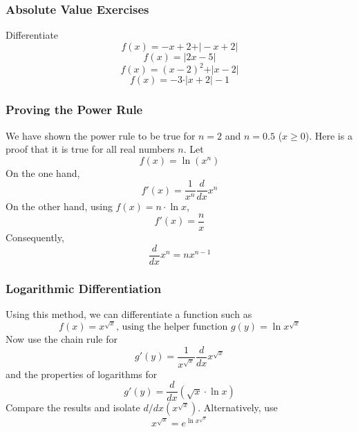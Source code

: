 \documentclass[xcolor=dvipsnames]{beamer}
\begin{document}
\begin{frame}
  \frametitle{Absolute Value Exercises}
Differentiate
\begin{equation}
  \label{eq:ikaishup}
  f(x)=-x+2+\vert{}-x+2\vert
\end{equation}
\begin{equation}
  \label{eq:emaiyito}
  f(x)=\vert{}2x-5\vert
\end{equation}
\begin{equation}
  \label{eq:deiquohr}
  f(x)=(x-2)^{2}+\vert{}x-2\vert
\end{equation}
\begin{equation}
  \label{eq:leihuwee}
  f(x)=-3\cdot\vert{}x+2\vert{}-1
\end{equation}
\end{frame}

\begin{frame}
  \frametitle{Proving the Power Rule}
  We have shown the power rule to be true for $n=2$ and $n=0.5$
  ($x\geq{}0$). Here is a proof that it is true for all real numbers
  $n$. Let
\begin{equation}
  \label{eq:taesaeph}
  f(x)=\ln\left({}x^{n}\right)
\end{equation}
On the one hand,
\begin{equation}
  \label{eq:uzahheir}
  f'(x)=\frac{1}{x^{n}}\frac{d}{dx}x^{n}
\end{equation}
On the other hand, using $f(x)=n\cdot\ln{}x$,
\begin{equation}
  \label{eq:veikoowa}
f'(x)=\frac{n}{x}  
\end{equation}
Consequently,
\begin{equation}
  \label{eq:aebiedah}
  \frac{d}{dx}x^{n}=nx^{n-1}
\end{equation}
\end{frame}

\begin{frame}
  \frametitle{Logarithmic Differentiation}
Using this method, we can differentiate a function such as
\begin{equation}
  \label{eq:ooteiquo}
  f(x)=x^{\sqrt{x}}\mbox{, using the helper function }g(y)=\ln{}x^{\sqrt{x}}
\end{equation}
Now use the chain rule for
\begin{equation}
  \label{eq:quuquish}
  g'(y)=\frac{1}{x^{\sqrt{x}}}\frac{d}{dx}x^{\sqrt{x}}
\end{equation}
and the properties of logarithms for
\begin{equation}
  \label{eq:ahfahngi}
  g'(y)=\frac{d}{dx}\left(\sqrt{x}\cdot\ln{}x\right)
\end{equation}
Compare the results and isolate $d/dx(x^{\sqrt{x}})$. Alternatively,
use
\begin{equation}
  \label{eq:gaibahto}
  x^{\sqrt{x}}=e^{\ln{}x^{\sqrt{x}}}
\end{equation}
\end{frame}
\end{document}
